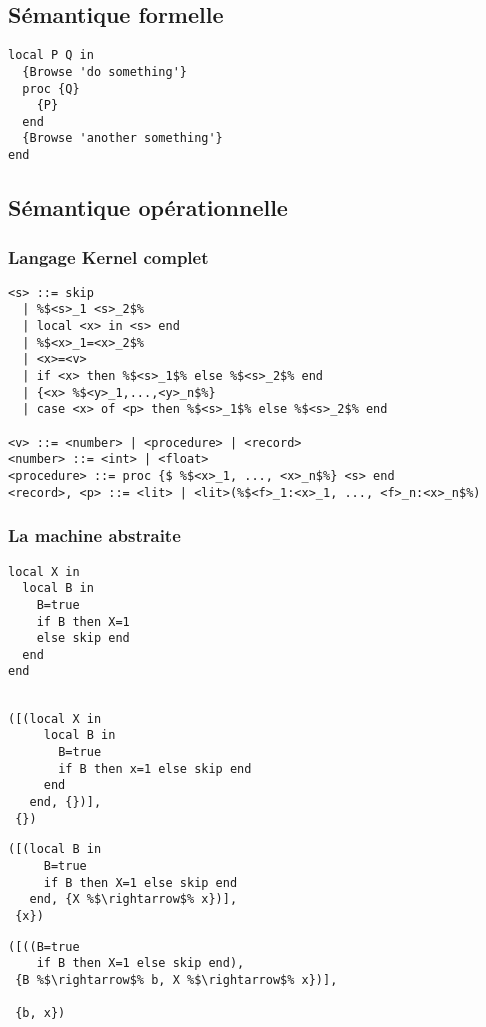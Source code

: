 \documentclass{report}
\begin{document}
\subsection{Sémantique formelle}
\begin{lstlisting}
local P Q in
  {Browse 'do something'}
  proc {Q}
    {P}
  end
  {Browse 'another something'}
end
\end{lstlisting}

\subsection{Sémantique opérationnelle}
\subsubsection{Langage Kernel complet}
\begin{lstlisting}[escapechar=\%]
<s> ::= skip 
  | %$<s>_1 <s>_2$% 
  | local <x> in <s> end 
  | %$<x>_1=<x>_2$% 
  | <x>=<v> 
  | if <x> then %$<s>_1$% else %$<s>_2$% end 
  | {<x> %$<y>_1,...,<y>_n$%} 
  | case <x> of <p> then %$<s>_1$% else %$<s>_2$% end

<v> ::= <number> | <procedure> | <record>  
<number> ::= <int> | <float> 
<procedure> ::= proc {$ %$<x>_1, ..., <x>_n$%} <s> end
<record>, <p> ::= <lit> | <lit>(%$<f>_1:<x>_1, ..., <f>_n:<x>_n$%)
\end{lstlisting}

\subsubsection{La machine abstraite}
\begin{minipage}[t]{0.45\linewidth}
\begin{lstlisting}[caption={Programme en Oz}]
local X in
  local B in
    B=true
    if B then X=1 
    else skip end
  end
end
  
\end{lstlisting}
\end{minipage}
%
\begin{minipage}[t]{0.45\linewidth}
\begin{lstlisting}[caption={État initial}]
([(local X in 
     local B in 
       B=true
       if B then x=1 else skip end
     end
   end, {})],
 {})
\end{lstlisting}
\end{minipage}

\begin{minipage}[t]{0.45\linewidth}
\begin{lstlisting}[escapechar=\%]
([(local B in
     B=true
     if B then X=1 else skip end
   end, {X %$\rightarrow$% x})],
 {x})
\end{lstlisting}
\end{minipage}
%
\begin{minipage}[t]{0.45\linewidth}
\begin{lstlisting}[escapechar=\%]
([((B=true
    if B then X=1 else skip end),
 {B %$\rightarrow$% b, X %$\rightarrow$% x})],
 
 {b, x})
\end{lstlisting}
\end{minipage}
\end{document}
